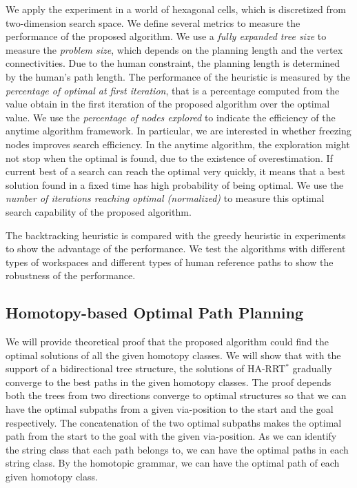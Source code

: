 \documentclass[phd]{byuprop}
\begin{document}
We apply the experiment in a world of hexagonal cells, which is discretized from two-dimension search space.
We define several metrics to measure the performance of the proposed algorithm.
We use a \emph{fully expanded tree size} to measure the \emph{problem size}, which depends on the planning length and the vertex connectivities.
Due to the human constraint, the planning length is determined by the human's path length.
The performance of the heuristic is measured by the \emph{percentage of optimal at first iteration}, that is a percentage computed from the value obtain in the first iteration of the proposed algorithm over the optimal value.
We use the \emph{percentage of nodes explored} to indicate the efficiency of the anytime algorithm framework.
In particular, we are interested in whether freezing nodes improves search efficiency.
In the anytime algorithm, the exploration might not stop when the optimal is found, due to the existence of overestimation.
If current best of a search can reach the optimal very quickly, it means that a best solution found in a fixed time has high probability of being optimal.
We use the \emph{number of iterations reaching optimal (normalized)} to measure this optimal search capability of the proposed algorithm.

The backtracking heuristic is compared with the greedy heuristic in experiments to show the advantage of the performance.
We test the algorithms with different types of workspaces and different types of human reference paths to show the robustness of the performance.


\subsection{Homotopy-based Optimal Path Planning}

We will provide theoretical proof that the proposed algorithm could find the optimal solutions of all the given homotopy classes.
We will show that with the support of a bidirectional tree structure, the solutions of HA-RRT$^{*}$ gradually converge to the best paths in the given homotopy classes.
The proof depends both the trees from two directions converge to optimal structures so that we can have the optimal subpaths from a given via-position to the start and the goal respectively.
The concatenation of the two optimal subpaths makes the optimal path from the start to the goal with the given via-position.
As we can identify the string class that each path belongs to, we can have the optimal paths in each string class.
By the homotopic grammar, we can have the optimal path of each given homotopy class.
\end{document}
